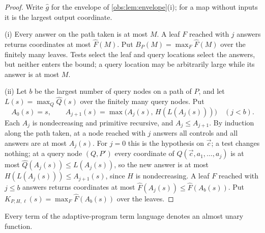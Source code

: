 \begin{proof}
Write $\widehat g$ for the envelope of \cref{obs:lem:envelope}(i); for a map
without inputs it is the largest output coordinate.

(i) Every answer on the path taken is at most $M$. A leaf $F$ reached with $j$
answers returns coordinates at most $\widehat F(M)$. Put
$B_P(M)=\max_F\widehat F(M)$ over the finitely many leaves. Tests select the
leaf and query locations select the answers, but neither enters the bound; a
query location may be arbitrarily large while its answer is at most $M$.

(ii) Let $b$ be the largest number of query nodes on a path of $P$, and let
$L(s)=\max_Q\widehat Q(s)$ over the finitely many query nodes. Put
\[
A_0(s)=s,\qquad A_{j+1}(s)=\max\bigl(A_j(s),\,H(L(A_j(s)))\bigr)\quad(j<b).
\]
Each $A_j$ is nondecreasing and primitive recursive, and $A_j\le A_{j+1}$. By
induction along the path taken, at a node reached with $j$ answers all controls
and all answers are at most $A_j(s)$. For $j=0$ this is the hypothesis on
$\vec c$; a test changes nothing; at a query node $(Q,P')$ every coordinate of
$Q(\vec c,a_1,\dots,a_j)$ is at most $\widehat Q(A_j(s))\le L(A_j(s))$, so the
new answer is at most $H(L(A_j(s)))\le A_{j+1}(s)$, since $H$ is
nondecreasing. A leaf $F$ reached with $j\le b$ answers returns coordinates at
most $\widehat F(A_j(s))\le\widehat F(A_b(s))$. Put
$K_{P,H,\ell}(s)=\max_F\widehat F(A_b(s))$ over the leaves.
\end{proof}

\begin{theorem}
\label{obs:thm:adaptive}
Every term of the adaptive-program term language denotes an almost unary
function.
\end{theorem}

